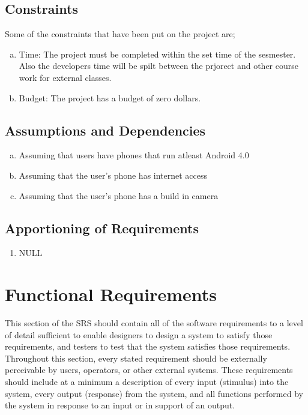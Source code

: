 \documentclass[]{article}
\begin{document}
\subsection{Constraints}

\label{sub:constraints}
Some of the constraints that have been put on the project are;
\begin{enumerate}[a)]
	\item Time: The project must be completed within the set time of the sesmester. Also the developers time will be spilt between the prjorect and other course work for external classes. 
	\item Budget: The project has a budget of zero dollars.  
\end{enumerate}

\subsection{Assumptions and Dependencies}
\label{sub:assumptions_and_dependencies}
\begin{enumerate}[a)]
	\item Assuming that users have phones that run atleast Android 4.0
	\item Assuming that the user's phone has internet access
	\item Assuming that the user's phone has a build in camera 
\end{enumerate}

\subsection{Apportioning of Requirements}
\label{sub:apportioning_of_requirements}
\begin{enumerate}
\item NULL 
\end{enumerate}

\section{Functional Requirements}
\label{sec:functional_requirements}
This section of the SRS should contain all of the software requirements to a level of detail sufficient to enable designers to design a system to satisfy those requirements, and testers to test that the system satisfies those requirements. Throughout this section, every stated requirement should be externally perceivable by users, operators, or other external systems. These requirements should include at a minimum a description of every input (stimulus) into the system, every output (response) from the system, and all functions performed by the system in response to an input or in support of an output.
\end{document}
